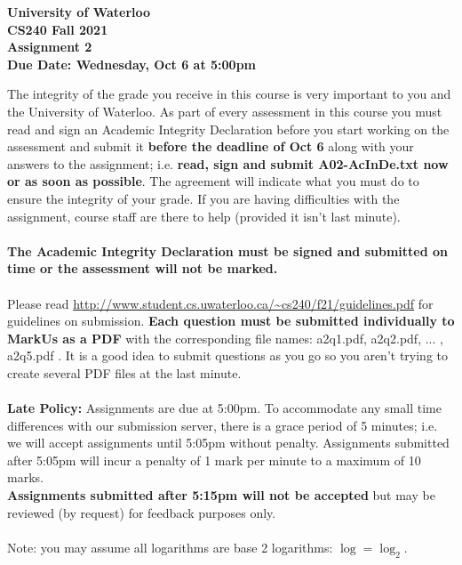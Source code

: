 \documentclass[12pt]{article}
\begin{document}
	
	\begin{center}
		{\Large\bf University of Waterloo}\\
		\vspace{3mm}
		{\Large\bf CS240 Fall 2021}\\
		\vspace{2mm}
		{\Large\bf Assignment 2}\\
		\vspace{3mm}
		\textbf{Due Date: Wednesday, Oct 6 at 5:00pm}
	\end{center}
	
	\def\question#1{\item[\bf #1.]}
	\def\part#1{\item[\bf #1)]}
	\newcommand{\pc}[1]{\mbox{\textbf{#1}}} %
	
	The integrity of the grade you receive in this course is very important to you and the University of Waterloo.  
	As part of every assessment in this course you must read and sign an Academic Integrity Declaration before you start working on the assessment and submit it \textbf{before the deadline of Oct 6} along with your answers to the assignment; i.e. \textbf{read, sign and submit A02-AcInDe.txt now or as soon as possible}.
	The agreement will indicate what you must do to ensure the integrity of your grade.
	If you are having difficulties with the assignment, course staff are there to help (provided it isn't last minute). \\
	~\\
	\textbf{The Academic Integrity Declaration must be signed and submitted on time or the
		assessment will not be marked.} \\
	~\\
	Please read
	\url{http://www.student.cs.uwaterloo.ca/~cs240/f21/guidelines.pdf} for guidelines on submission.  
	\textbf{Each question must be submitted individually to MarkUs as a PDF} with the corresponding file names: 
	a2q1.pdf, a2q2.pdf, ... , a2q5.pdf . 
	It is a good idea to submit questions as you go so you aren't trying to create several PDF files at the last minute. \\
	~\\
	\textbf{Late Policy:} Assignments are due at 5:00pm.
	To accommodate any small time differences with our submission server, there is a grace period of 5 minutes; i.e. we will accept assignments until 5:05pm without penalty.  Assignments submitted after 5:05pm will incur a penalty of 1 mark per minute to a maximum of 10 marks.   \\
	\textbf{Assignments submitted after 5:15pm will not be accepted}  
	but may be reviewed (by request) for feedback purposes only. \\  
	~\\
	Note: you may assume all logarithms are base 2 logarithms:  $\log = \log_2$.
	
\end{document}
